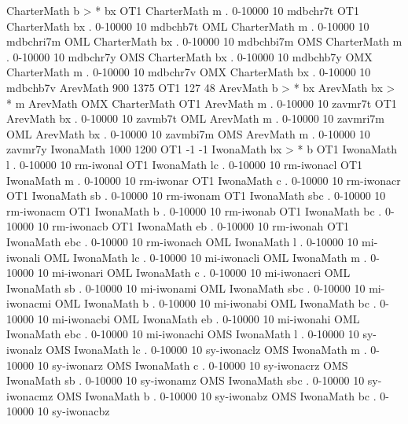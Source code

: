 \fontmapseries CharterMath b > * bx
\declarefont OT1 CharterMath m  . 0-10000 10 mdbchr7t
\declarefont OT1 CharterMath bx . 0-10000 10 mdbchb7t
\declarefont OML CharterMath m  . 0-10000 10 mdbchri7m
\declarefont OML CharterMath bx . 0-10000 10 mdbchbi7m
\declarefont OMS CharterMath m  . 0-10000 10 mdbchr7y
\declarefont OMS CharterMath bx . 0-10000 10 mdbchb7y
\declarefont OMX CharterMath m  . 0-10000 10 mdbchr7v
\declarefont OMX CharterMath bx . 0-10000 10 mdbchb7v
%
%
\declaremathfontfamily ArevMath 900 1375 OT1 127 48
\fontmapseries ArevMath b > * bx
\fontmapseries ArevMath bx > * m
\fontmapfamily ArevMath OMX CharterMath
\declarefont OT1 ArevMath m  . 0-10000 10 zavmr7t
\declarefont OT1 ArevMath bx . 0-10000 10 zavmb7t
\declarefont OML ArevMath m  . 0-10000 10 zavmri7m
\declarefont OML ArevMath bx . 0-10000 10 zavmbi7m
\declarefont OMS ArevMath m  . 0-10000 10 zavmr7y
%
%
\declaremathfontfamily IwonaMath 1000 1200 OT1 -1 -1
\fontmapseries IwonaMath bx > * b
\declarefont OT1 IwonaMath l   . 0-10000 10 rm-iwonal
\declarefont OT1 IwonaMath lc  . 0-10000 10 rm-iwonacl
\declarefont OT1 IwonaMath m   . 0-10000 10 rm-iwonar
\declarefont OT1 IwonaMath c   . 0-10000 10 rm-iwonacr
\declarefont OT1 IwonaMath sb  . 0-10000 10 rm-iwonam
\declarefont OT1 IwonaMath sbc . 0-10000 10 rm-iwonacm
\declarefont OT1 IwonaMath b   . 0-10000 10 rm-iwonab
\declarefont OT1 IwonaMath bc  . 0-10000 10 rm-iwonacb
\declarefont OT1 IwonaMath eb  . 0-10000 10 rm-iwonah
\declarefont OT1 IwonaMath ebc . 0-10000 10 rm-iwonach
\declarefont OML IwonaMath l   . 0-10000 10 mi-iwonali
\declarefont OML IwonaMath lc  . 0-10000 10 mi-iwonacli
\declarefont OML IwonaMath m   . 0-10000 10 mi-iwonari
\declarefont OML IwonaMath c   . 0-10000 10 mi-iwonacri
\declarefont OML IwonaMath sb  . 0-10000 10 mi-iwonami
\declarefont OML IwonaMath sbc . 0-10000 10 mi-iwonacmi
\declarefont OML IwonaMath b   . 0-10000 10 mi-iwonabi
\declarefont OML IwonaMath bc  . 0-10000 10 mi-iwonacbi
\declarefont OML IwonaMath eb  . 0-10000 10 mi-iwonahi
\declarefont OML IwonaMath ebc . 0-10000 10 mi-iwonachi
\declarefont OMS IwonaMath l   . 0-10000 10 sy-iwonalz
\declarefont OMS IwonaMath lc  . 0-10000 10 sy-iwonaclz
\declarefont OMS IwonaMath m   . 0-10000 10 sy-iwonarz
\declarefont OMS IwonaMath c   . 0-10000 10 sy-iwonacrz
\declarefont OMS IwonaMath sb  . 0-10000 10 sy-iwonamz
\declarefont OMS IwonaMath sbc . 0-10000 10 sy-iwonacmz
\declarefont OMS IwonaMath b   . 0-10000 10 sy-iwonabz
\declarefont OMS IwonaMath bc  . 0-10000 10 sy-iwonacbz
